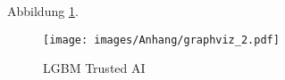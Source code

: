 Abbildung \ref{img:lgbm_dectree}.

\begin{figure}[H]
	\centering
	\texttt{[image: images/Anhang/graphviz\_2.pdf]} %
	\caption[LGBM Trusted AI]{LGBM Trusted AI}
	\label{img:lgbm_dectree}
\end{figure}
